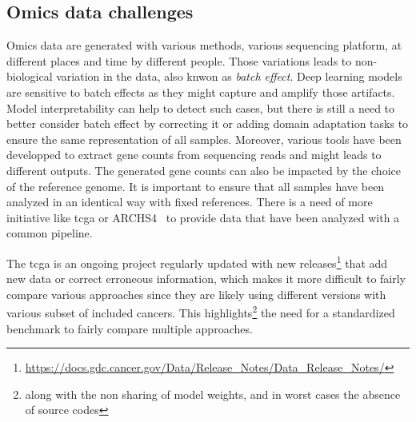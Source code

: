 \documentclass[../main.tex]{subfiles}
\begin{document}
	\subsection{Omics data challenges}
		Omics data are generated with various methods, various sequencing platform, at different places and time by different people.
		Those variations leads to non-biological variation in the data, also knwon as \textit{batch effect}.
		Deep learning models are sensitive to batch effects as they might capture and amplify those artifacts.
		Model interpretability can help to detect such cases, but there is still a need to better consider batch effect by correcting it or adding domain adaptation tasks to ensure the same representation of all samples.
		Moreover, various tools have been developped to extract gene counts from sequencing reads and might leads to different outputs.
		The generated gene counts can also be impacted by the choice of the reference genome.
		It is important to ensure that all samples have been analyzed in an identical way with fixed references.
		There is a need of more initiative like \Gls{tcga} or ARCHS4~\cite{Lachmann2018} to provide data that have been analyzed with a common pipeline.

		The \gls{tcga} is an ongoing project regularly updated with new releases\footnote{\url{https://docs.gdc.cancer.gov/Data/Release_Notes/Data_Release_Notes/}} that add new data or correct erroneous information, which makes it more difficult to fairly compare various approaches since they are likely using different versions with various subset of included cancers.
		This highlights\footnote{along with the non sharing of model weights, and in worst cases the absence of source codes} the need for a standardized benchmark to fairly compare multiple approaches.
\end{document}

